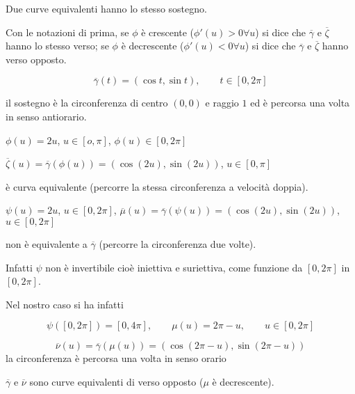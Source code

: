 \begin{attbar}
	Due curve equivalenti hanno lo stesso sostegno.
\end{attbar}


\begin{definition}
	Con le notazioni di prima, se $\phi$ è crescente {\color{blue}($\phi'(u)>0 \forall u$)} si dice che $\overline{\gamma}$ e $\overline{\zeta}$ hanno lo stesso verso; se $\phi$ è decrescente {\color{blue}($\phi'(u)<0 \forall u $)} si dice che $\overline{\gamma}$ e $\overline{\zeta}$ hanno verso opposto.

	\segnaposto %
\end{definition}


\begin{exbar}
\begin{example}
	$$\overline{\gamma}(t)=(\cos t, \sin t), \qquad t\in [0,2\pi]$$
	
	il sostegno è la circonferenza di centro $(0,0)$ e raggio $1$ ed è percorsa una volta  in senso antiorario. 
	
	{\centering $\phi(u)=2u$, $u\in [o,\pi]$, $\phi(u)\in[0,2\pi]$
		
		$\overline{\zeta}(u)=\overline{\gamma}(\phi(u))=(\cos (2u),\sin (2u))$, $u \in [0,\pi]$
	\par}
	
	è curva equivalente {\color{blue}(percorre la stessa circonferenza a velocità doppia)}.
	
	{\centering $\psi(u)=2u$, $u \in [0, 2\pi]$, $\overline{\mu}(u)=\overline{\gamma}(\psi(u))=(\cos(2u), \sin (2u))$, $u \in [0,2\pi]$ \par}
	
	non è equivalente a $\overline{\gamma}$ {\color{blue}(percorre la circonferenza due volte)}. 
	
	Infatti $\psi$ non è invertibile {\color{blue}cioè iniettiva e suriettiva,} come funzione da $[0,2\pi]$ in $[0,2\pi]$. 
	
	Nel nostro caso si ha infatti 
	
	$$\psi ([0,2\pi])=[0,4\pi], \qquad \mu (u)=2\pi-u, \qquad u \in [0,2\pi]$$
	
	$$\overline{\nu}(u)=\overline{\gamma}(\mu(u))=(\cos(2\pi-u),\sin(2\pi-u))$$ {\color{blue}la circonferenza è percorsa una volta in senso orario} 
	
	$\overline{\gamma}$ e $\overline{\nu}$ sono curve equivalenti di verso opposto ($\mu$ è decrescente).
\end{example}
\end{exbar}


